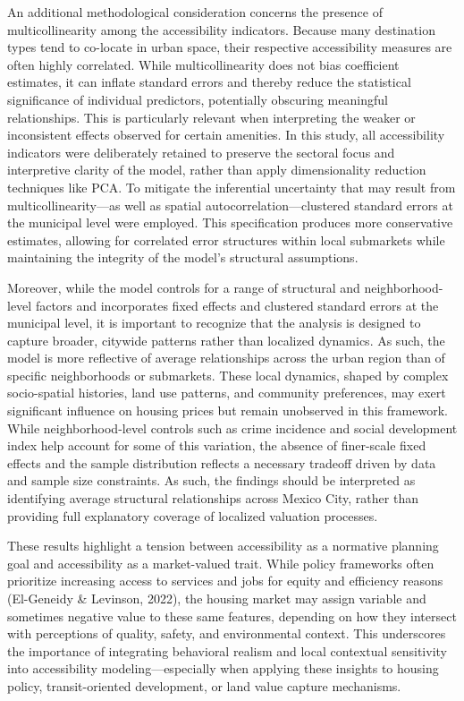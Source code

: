 \documentclass[
  12pt,
]{report}
\begin{document}
An additional methodological consideration concerns the presence of
multicollinearity among the accessibility indicators. Because many
destination types tend to co-locate in urban space, their respective
accessibility measures are often highly correlated. While
multicollinearity does not bias coefficient estimates, it can inflate
standard errors and thereby reduce the statistical significance of
individual predictors, potentially obscuring meaningful relationships.
This is particularly relevant when interpreting the weaker or
inconsistent effects observed for certain amenities. In this study, all
accessibility indicators were deliberately retained to preserve the
sectoral focus and interpretive clarity of the model, rather than apply
dimensionality reduction techniques like PCA. To mitigate the
inferential uncertainty that may result from multicollinearity---as well
as spatial autocorrelation---clustered standard errors at the municipal
level were employed. This specification produces more conservative
estimates, allowing for correlated error structures within local
submarkets while maintaining the integrity of the model's structural
assumptions.

Moreover, while the model controls for a range of structural and
neighborhood-level factors and incorporates fixed effects and clustered
standard errors at the municipal level, it is important to recognize
that the analysis is designed to capture broader, citywide patterns
rather than localized dynamics. As such, the model is more reflective of
average relationships across the urban region than of specific
neighborhoods or submarkets. These local dynamics, shaped by complex
socio-spatial histories, land use patterns, and community preferences,
may exert significant influence on housing prices but remain unobserved
in this framework. While neighborhood-level controls such as crime
incidence and social development index help account for some of this
variation, the absence of finer-scale fixed effects and the sample
distribution reflects a necessary tradeoff driven by data and sample
size constraints. As such, the findings should be interpreted as
identifying average structural relationships across Mexico City, rather
than providing full explanatory coverage of localized valuation
processes.

These results highlight a tension between accessibility as a normative
planning goal and accessibility as a market-valued trait. While policy
frameworks often prioritize increasing access to services and jobs for
equity and efficiency reasons (El-Geneidy \& Levinson, 2022), the
housing market may assign variable and sometimes negative value to these
same features, depending on how they intersect with perceptions of
quality, safety, and environmental context. This underscores the
importance of integrating behavioral realism and local contextual
sensitivity into accessibility modeling---especially when applying these
insights to housing policy, transit-oriented development, or land value
capture mechanisms.
\end{document}
